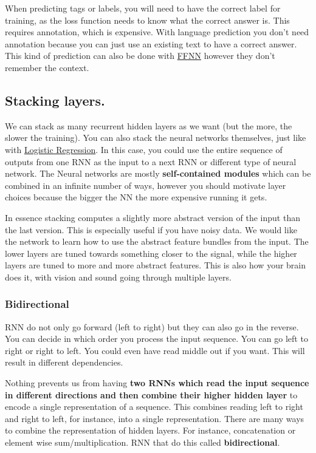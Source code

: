 \documentclass[
  11pt,
  british,
]{article}
\begin{document}
When predicting tags or labels, you will need to have the correct label
for training, as the loss function needs to know what the correct answer
is. This requires annotation, which is expensive. With language
prediction you don't need annotation because you can just use an
existing text to have a correct answer. This kind of prediction can also
be done with
\href{Feed\%20forward\%20neural\%20networks\%20(FFNN).md}{FFNN} however
they don't remember the context.

\hypertarget{stacking-layers.}{%
\subsection{Stacking layers.}\label{stacking-layers.}}

We can stack as many recurrent hidden layers as we want (but the more,
the slower the training). You can also stack the neural networks
themselves, just like with
\href{Classification/Logistic\%20Regression.md}{Logistic Regression}. In
this case, you could use the entire sequence of outputs from one RNN as
the input to a next RNN or different type of neural network. The Neural
networks are mostly \textbf{self-contained modules} which can be
combined in an infinite number of ways, however you should motivate
layer choices because the bigger the NN the more expensive running it
gets.

In essence stacking computes a slightly more abstract version of the
input than the last version. This is especially useful if you have noisy
data. We would like the network to learn how to use the abstract feature
bundles from the input. The lower layers are tuned towards something
closer to the signal, while the higher layers are tuned to more and more
abstract features. This is also how your brain does it, with vision and
sound going through multiple layers.

\hypertarget{bidirectional}{%
\subsubsection{Bidirectional}\label{bidirectional}}

RNN do not only go forward (left to right) but they can also go in the
reverse. You can decide in which order you process the input sequence.
You can go left to right or right to left. You could even have read
middle out if you want. This will result in different dependencies.

Nothing prevents us from having \textbf{two RNNs which read the input
sequence in different directions and then combine their higher hidden
layer} to encode a single representation of a sequence. This combines
reading left to right and right to left, for instance, into a single
representation. There are many ways to combine the representation of
hidden layers. For instance, concatenation or element wise
sum/multiplication. RNN that do this called \textbf{bidirectional}.
\end{document}
